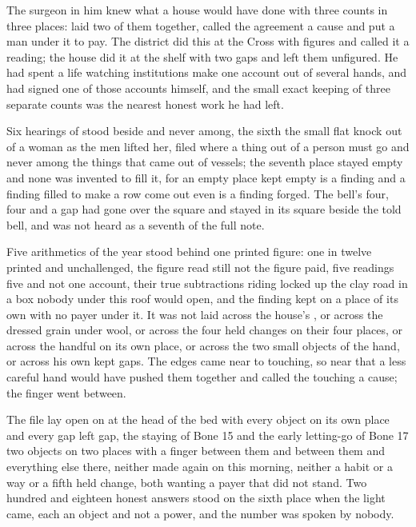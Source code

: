 The surgeon in him knew what a house would have done with three counts in three places: laid two of them together, called the agreement a cause and put a man under it to pay. The district did this at the Cross with figures and called it a reading; the house did it at the shelf with two gaps and left them unfigured. He had spent a life watching institutions make one account out of several hands, and had signed one of those accounts himself, and the small exact keeping of three separate counts was the nearest honest work he had left.

Six hearings of  stood beside and never among, the sixth the small flat knock out of a woman as the men lifted her, filed where a thing out of a person must go and never among the things that came out of vessels; the seventh place stayed empty and none was invented to fill it, for an empty place kept empty is a finding and a finding filled to make a row come out even is a finding forged. The bell's four, four and a gap had gone over the square and stayed in its square beside the told bell, and was not heard as a seventh of the full note.

Five arithmetics of the year stood behind one printed figure: one in twelve printed and unchallenged, the figure read still not the figure paid, five readings five and not one account, their true subtractions riding locked up the clay road in a box nobody under this roof would open, and the finding kept on a place of its own with no payer under it. It was not laid across the house's , or across the dressed grain under wool, or across the four held changes on their four places, or across the handful on its own place, or across the two small objects of the hand, or across his own kept gaps. The edges came near to touching, so near that a less careful hand would have pushed them together and called the touching a cause; the finger went between.

The file lay open on  at the head of the bed with every object on its own place and every gap left gap, the staying of Bone 15 and the early letting-go of Bone 17 two objects on two places with a finger between them and between them and everything else there, neither made again on this morning, neither a habit or a way or a fifth held change, both wanting a payer that did not stand. Two hundred and eighteen honest answers stood on the sixth place when the light came, each an object and not a power, and the number was spoken by nobody.

\scenebreak

